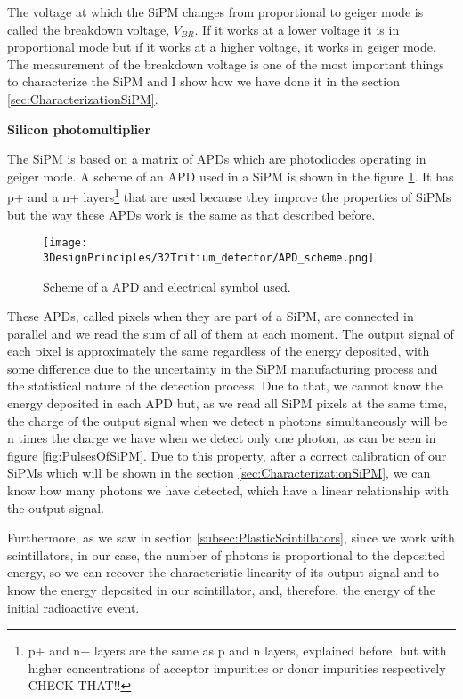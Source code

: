 The voltage at which the SiPM changes from proportional to geiger mode is called the breakdown voltage, $ V_ {BR} $. If it works at a lower voltage it is in proportional mode but if it works at a higher voltage, it works in geiger mode. The measurement of the breakdown voltage is one of the most important things to characterize the SiPM and I show how we have done it in the section \ref{sec:CharacterizationSiPM}.

\textbf{Silicon photomultiplier}

The SiPM is based on a matrix of APDs which are photodiodes operating in geiger mode. A scheme of an APD used in a SiPM is shown in the figure \ref{fig:SchemeAPD}. It has p+ and a n+ layers\footnote{p+ and n+ layers are the same as p and n layers, explained before, but with higher concentrations of acceptor impurities or donor impurities respectively CHECK THAT!!} that are used because they improve the properties of SiPMs but the way these APDs work is the same as that described before. 

\begin{figure}[htbp]
\centering
\texttt{[image: 3DesignPrinciples/32Tritium\_detector/APD\_scheme.png]}
\caption{Scheme of a APD and electrical symbol used.\label{fig:SchemeAPD}~\cite{OSI}}
\end{figure}
 
These APDs, called pixels when they are part of a SiPM, are connected in parallel and we read the sum of all of them at each moment. The output signal of each pixel is approximately the same regardless of the energy deposited, with some difference due to the uncertainty in the SiPM manufacturing process and the statistical nature of the detection process. Due to that, we cannot know the energy deposited in each APD but, as we read all SiPM pixels at the same time, the charge of the output signal when we detect n photons simultaneously will be n times the charge we have when we detect only one photon, as can be seen in figure \ref{fig:PulsesOfSiPM}. Due to this property, after a correct calibration of our SiPMs which will be shown in the section \ref{sec:CharacterizationSiPM}, we can know how many photons we have detected, which have a linear relationship with the output signal. 

Furthermore, as we saw in section \ref{subsec:PlasticScintillators}, since we work with scintillators, in our case, the number of photons is proportional to the deposited energy, so we can recover the characteristic linearity of its output signal and to know the energy deposited in our scintillator, and, therefore, the energy of the initial radioactive event.

